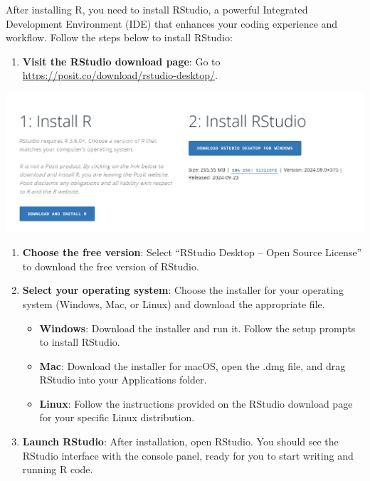 \documentclass[
]{book}
\providecommand{\tightlist}{%
  \setlength{\itemsep}{0pt}\setlength{\parskip}{0pt}}
\begin{document}
After installing R, you need to install RStudio, a powerful Integrated Development Environment (IDE) that enhances your coding experience and workflow. Follow the steps below to install RStudio:

\begin{enumerate}
\def\labelenumi{\arabic{enumi}.}
\tightlist
\item
  \textbf{Visit the RStudio download page}: Go to \url{https://posit.co/download/rstudio-desktop/}.
\end{enumerate}

\href{https://posit.co/download/rstudio-desktop/}{\includegraphics[width=1\linewidth,height=\textheight,keepaspectratio]{images/r-studio.png}}

\begin{enumerate}
\def\labelenumi{\arabic{enumi}.}
\setcounter{enumi}{1}
\tightlist
\item
  \textbf{Choose the free version}: Select ``RStudio Desktop -- Open Source License'' to download the free version of RStudio.
\item
  \textbf{Select your operating system}: Choose the installer for your operating system (Windows, Mac, or Linux) and download the appropriate file.

  \begin{itemize}
  \tightlist
  \item
    \textbf{Windows}: Download the installer and run it. Follow the setup prompts to install RStudio.
  \item
    \textbf{Mac}: Download the installer for macOS, open the .dmg file, and drag RStudio into your Applications folder.
  \item
    \textbf{Linux}: Follow the instructions provided on the RStudio download page for your specific Linux distribution.
  \end{itemize}
\item
  \textbf{Launch RStudio}: After installation, open RStudio. You should see the RStudio interface with the console panel, ready for you to start writing and running R code.
\end{enumerate}
\end{document}
